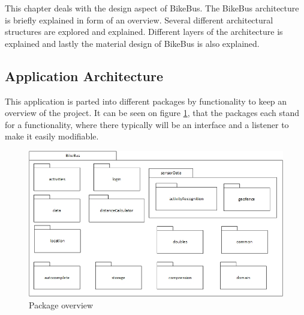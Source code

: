 
This chapter deals with the design aspect of BikeBus. The BikeBus architecture is briefly explained in form of an overview. Several different architectural structures are explored and explained. Different layers of the architecture is explained and lastly the material design of BikeBus is also explained. 

\subsection{Application Architecture}
\label{application_architecture}




This application is parted into different packages by functionality to keep an overview of the project. It can be seen on figure \ref{fig:packagediagram}, that the packages each stand for a functionality, where there typically will be an interface and a listener to make it easily modifiable.

\begin{figure}[H]
    \centering
    \includegraphics[scale=0.45]{Graphics/Images/PackageOverview.png}
    \caption{Package overview}
    \label{fig:packagediagram}
\end{figure}


